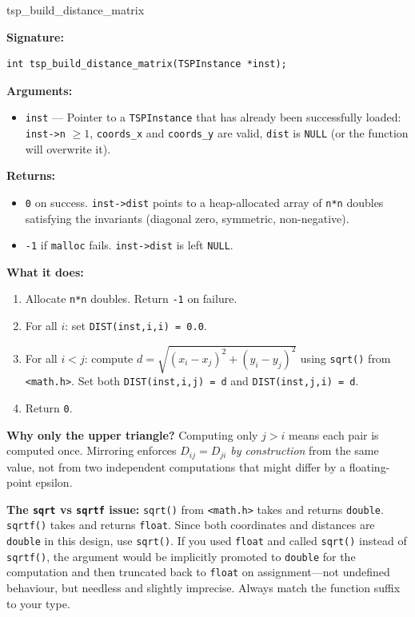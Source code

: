\documentclass[11pt]{article}
\begin{document}
\begin{apispec}{tsp\_build\_distance\_matrix}

\textbf{Signature:}
\begin{lstlisting}[style=cstyle, numbers=none]
int tsp_build_distance_matrix(TSPInstance *inst);
\end{lstlisting}

\textbf{Arguments:}
\begin{itemize}
  \item \texttt{inst} --- Pointer to a \texttt{TSPInstance} that has already been successfully loaded: \texttt{inst->n} $\geq 1$, \texttt{coords\_x} and \texttt{coords\_y} are valid, \texttt{dist} is \texttt{NULL} (or the function will overwrite it).
\end{itemize}

\textbf{Returns:}
\begin{itemize}
  \item \texttt{0} on success. \texttt{inst->dist} points to a heap-allocated array of \texttt{n*n} doubles satisfying the invariants (diagonal zero, symmetric, non-negative).
  \item \texttt{-1} if \texttt{malloc} fails. \texttt{inst->dist} is left \texttt{NULL}.
\end{itemize}

\textbf{What it does:}
\begin{enumerate}[label=\arabic*.]
  \item Allocate \texttt{n*n} doubles. Return \texttt{-1} on failure.
  \item For all $i$: set \texttt{DIST(inst,i,i) = 0.0}.
  \item For all $i < j$: compute $d = \sqrt{(x_i - x_j)^2 + (y_i - y_j)^2}$ using \texttt{sqrt()} from \texttt{<math.h>}. Set both \texttt{DIST(inst,i,j) = d} and \texttt{DIST(inst,j,i) = d}.
  \item Return \texttt{0}.
\end{enumerate}

\textbf{Why only the upper triangle?} Computing only $j > i$ means each pair is computed once. Mirroring enforces $D_{ij} = D_{ji}$ \emph{by construction} from the same value, not from two independent computations that might differ by a floating-point epsilon.

\textbf{The \texttt{sqrt} vs \texttt{sqrtf} issue:} \texttt{sqrt()} from \texttt{<math.h>} takes and returns \texttt{double}. \texttt{sqrtf()} takes and returns \texttt{float}. Since both coordinates and distances are \texttt{double} in this design, use \texttt{sqrt()}. If you used \texttt{float} and called \texttt{sqrt()} instead of \texttt{sqrtf()}, the argument would be implicitly promoted to \texttt{double} for the computation and then truncated back to \texttt{float} on assignment---not undefined behaviour, but needless and slightly imprecise. Always match the function suffix to your type.

\end{apispec}
\end{document}
